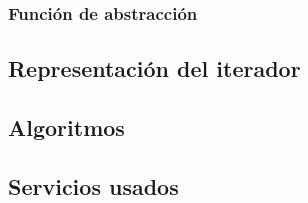 \subsubsection{Función de abstracción}




\subsection{Representación del iterador}


\subsection{Algoritmos}

\subsection{Servicios usados}


